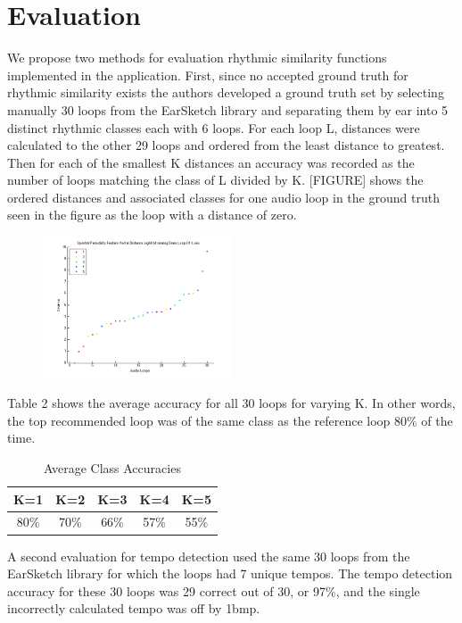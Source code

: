 \documentclass{article}
\begin{document}
\section{Evaluation}
We propose two methods for evaluation rhythmic similarity functions implemented in the application. First, since no accepted ground truth for rhythmic similarity exists the authors developed a ground truth set by selecting manually 30 loops from the EarSketch library and separating them by ear into 5 distinct rhythmic classes each with 6 loops. For each loop L, distances were calculated to the other 29 loops and ordered from the least distance to greatest. Then for each of the smallest K distances an accuracy was recorded as the number of loops matching the class of L divided by K. [FIGURE] shows the ordered distances and associated classes for one audio loop in the ground truth seen in the figure as the loop with a distance of zero.

\begin{figure}[h!]
  \centering
    \includegraphics[width=0.5\textwidth]{distance_graph_eval1.png}
      \caption{}
\end{figure}

Table 2 shows the average accuracy for all 30 loops for varying K. In other words, the top recommended loop was of the same class as the reference loop 80\% of the time.

\begin{table}[h!]
  \begin{center}
    \begin{tabular}{| c | c | c | c | c |}
    \hline
    K=1 & K=2 & K=3 & K=4 & K=5 \\
    \hline
    80\% & 70\% & 66\%  & 57\% & 55\% \\
    \hline
    \end{tabular}
  \end{center}
  \caption{Average Class Accuracies}
\end{table}

A second evaluation for tempo detection used the same 30 loops from the EarSketch library for which the loops had 7 unique tempos. The tempo detection accuracy for these 30 loops was 29 correct out of 30, or 97\%, and the single incorrectly calculated tempo was off by 1bmp.
\end{document}
